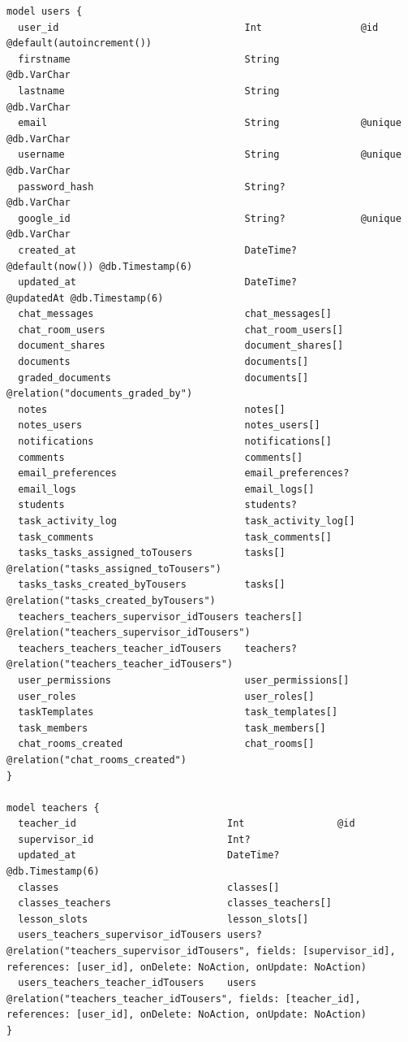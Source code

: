 \begin{listing}[H]
\begin{verbatim}
model users {
  user_id                                Int                 @id @default(autoincrement())
  firstname                              String              @db.VarChar
  lastname                               String              @db.VarChar
  email                                  String              @unique @db.VarChar
  username                               String              @unique @db.VarChar
  password_hash                          String?             @db.VarChar
  google_id                              String?             @unique @db.VarChar
  created_at                             DateTime?           @default(now()) @db.Timestamp(6)
  updated_at                             DateTime?           @updatedAt @db.Timestamp(6)
  chat_messages                          chat_messages[]
  chat_room_users                        chat_room_users[]
  document_shares                        document_shares[]
  documents                              documents[]
  graded_documents                       documents[]         @relation("documents_graded_by")
  notes                                  notes[]
  notes_users                            notes_users[]
  notifications                          notifications[]
  comments                               comments[]
  email_preferences                      email_preferences?
  email_logs                             email_logs[]
  students                               students?
  task_activity_log                      task_activity_log[]
  task_comments                          task_comments[]
  tasks_tasks_assigned_toTousers         tasks[]             @relation("tasks_assigned_toTousers")
  tasks_tasks_created_byTousers          tasks[]             @relation("tasks_created_byTousers")
  teachers_teachers_supervisor_idTousers teachers[]          @relation("teachers_supervisor_idTousers")
  teachers_teachers_teacher_idTousers    teachers?           @relation("teachers_teacher_idTousers")
  user_permissions                       user_permissions[]
  user_roles                             user_roles[]
  taskTemplates                          task_templates[]
  task_members                           task_members[]
  chat_rooms_created                     chat_rooms[]        @relation("chat_rooms_created")
}

model teachers {
  teacher_id                          Int                @id
  supervisor_id                       Int?
  updated_at                          DateTime?          @db.Timestamp(6)
  classes                             classes[]
  classes_teachers                    classes_teachers[]
  lesson_slots                        lesson_slots[]
  users_teachers_supervisor_idTousers users?             @relation("teachers_supervisor_idTousers", fields: [supervisor_id], references: [user_id], onDelete: NoAction, onUpdate: NoAction)
  users_teachers_teacher_idTousers    users              @relation("teachers_teacher_idTousers", fields: [teacher_id], references: [user_id], onDelete: NoAction, onUpdate: NoAction)
}


\end{verbatim}
\end{listing}
